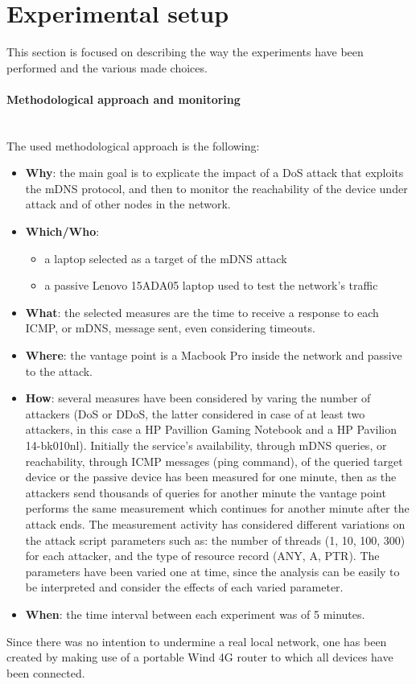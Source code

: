 \documentclass[fleqn, 11pt]{SelfArx} %
\begin{document}
\section{Experimental setup}
This section is focused on describing the way the experiments have been performed and the various made choices.

\paragraph{Methodological approach and monitoring}\mbox{}\\
The used methodological approach is the following:
\begin{itemize}[leftmargin=*]
	\item \textbf{Why}: the main goal is to explicate the impact of a DoS attack that exploits the mDNS protocol, and then to monitor the reachability of the device under attack and of other nodes in the network.
	\item \textbf{Which/Who}:
\begin{itemize}[leftmargin=*, noitemsep, topsep=0pt]
    \item a laptop selected as a target of the mDNS attack
    \item a passive Lenovo 15ADA05 laptop used to test the network's traffic
\end{itemize}
	\item \textbf{What}: the selected measures are the time to receive a response to each ICMP, or mDNS, message sent, even considering timeouts.
	\item \textbf{Where}: the vantage point is a Macbook Pro inside the network and passive to the attack.
	\item \textbf{How}: several measures have been considered by varing the number of attackers (DoS or DDoS, the latter considered in case of at least two attackers, in this case a HP Pavillion Gaming Notebook and a HP Pavilion 14-bk010nl). Initially the service's availability, through mDNS queries, or reachability, through ICMP messages (ping command), of the queried target device or the passive device has been measured for one minute, then as the attackers send thousands of queries for another minute the vantage point performs the same measurement which continues for another minute after the attack ends. \newline
The measurement activity has considered different variations on the attack script parameters such as: the number of threads (1, 10, 100, 300) for each attacker, and the type of resource record (ANY, A, PTR). The parameters have been varied one at time, since the analysis can be easily to be interpreted and consider the effects of each varied parameter.
\item \textbf{When}: the time interval between each experiment was of 5 minutes.
\end{itemize}
Since there was no intention to undermine a real local network, one has been created by making use of a portable Wind 4G router \cite{RouterSpecs} to which all devices have been connected.
\end{document}
